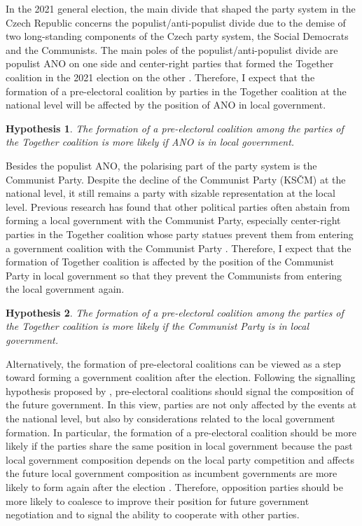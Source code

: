\documentclass[fignum,12pt,titlepage]{article}
\newtheorem{hypo}{Hypothesis}
\begin{document}
In the 2021 general election, the main divide that shaped the party system in the Czech Republic concerns the populist/anti-populist divide due to the demise of two long-standing components of the Czech party system, the Social Democrats and the Communists. The main poles of the populist/anti-populist divide are populist ANO on one side and center-right parties that formed the Together coalition in the 2021 election on the other \parencite{havlik2022}. 
Therefore, I expect that the formation of a pre-electoral coalition by parties in the Together coalition at the national level will be affected by the position of ANO in local government.

\begin{hypo}
{The formation of a pre-electoral coalition among the parties of the Together coalition is more likely if ANO is in local government.\label{hyp:3.1}}
\end{hypo}

Besides the populist ANO, the polarising part of the party system is the Communist Party.
Despite the decline of the Communist Party (KSČM) at the national level, it still remains a party with sizable representation at the local level. Previous research has found that other political parties often abstain from forming a local government with the Communist Party, especially center-right parties in the Together coalition whose party statues prevent them from entering a government coalition with the Communist Party \parencite{skvrnak2021}. Therefore, I expect that the formation of Together coalition is affected by the position of the Communist Party in local government so that they prevent the Communists from entering the local government again.

\begin{hypo}
{The formation of a pre-electoral coalition among the parties of the Together coalition is more likely if the Communist Party is in local government.\label{hyp:3.2}}
\end{hypo}

Alternatively, the formation of pre-electoral coalitions can be viewed as a step toward forming a government coalition after the election. Following the signalling hypothesis proposed by \textcite{golder2005}, pre-electoral coalitions should signal the composition of the future government. In this view, parties are not only affected by the events at the national level, but also by considerations related to the local government formation. 
In particular, the formation of a pre-electoral coalition should be more likely if the parties share the same position in local government because the past local government composition depends on the local party competition and affects the future local government composition as incumbent governments are more likely to form again after the election \parencite{back2008}. Therefore, opposition parties should be more likely to coalesce to improve their position for future government negotiation and to signal the ability to cooperate with other parties. 
\end{document}
